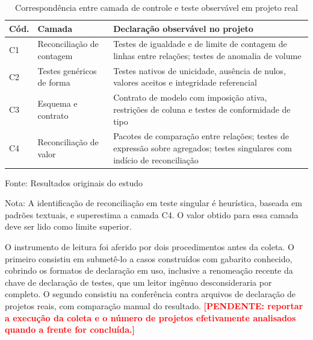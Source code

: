 \documentclass[11pt,a4paper]{article}
\newcommand{\fonteprop}[1]{%
  \par\vspace{2pt}%
  {\singlespacing\fontsize{11}{13}\selectfont\RaggedRight Fonte: #1\par}}
\newcommand{\fonteoriginal}{\fonteprop{Resultados originais do estudo}}
\newcommand{\notatab}[1]{%
  \par{\singlespacing\fontsize{11}{13}\selectfont\RaggedRight Nota: #1\par}}
\newcommand{\pend}[1]{\textcolor{red}{\textbf{[PENDENTE: #1]}}}
\begin{document}
\begin{table}[htbp]
\centering
\caption{Correspondência entre camada de controle e teste observável em projeto real}
\label{tab:mapeamento}
\begin{singlespace}
\fontsize{10}{12}\selectfont
\begin{tabular}{@{}p{0.8cm}p{4.4cm}p{9.4cm}@{}}
\toprule
\textbf{Cód.} & \textbf{Camada} & \textbf{Declaração observável no projeto} \\
\midrule
C1 & Reconciliação de contagem & Testes de igualdade e de limite de contagem de linhas entre relações; testes de anomalia de volume \\
C2 & Testes genéricos de forma & Testes nativos de unicidade, ausência de nulos, valores aceitos e integridade referencial \\
C3 & Esquema e contrato & Contrato de modelo com imposição ativa, restrições de coluna e testes de conformidade de tipo \\
C4 & Reconciliação de valor & Pacotes de comparação entre relações; testes de expressão sobre agregados; testes singulares com indício de reconciliação \\
\bottomrule
\end{tabular}
\end{singlespace}
\fonteoriginal
\notatab{A identificação de reconciliação em teste singular é heurística,
baseada em padrões textuais, e superestima a camada C4. O valor obtido
para essa camada deve ser lido como limite superior.}
\end{table}

O instrumento de leitura foi aferido por dois procedimentos antes da
coleta. O primeiro consistiu em submetê-lo a casos construídos com gabarito
conhecido, cobrindo os formatos de declaração em uso, inclusive a
renomeação recente da chave de declaração de testes, que um leitor ingênuo
desconsideraria por completo. O segundo consistiu na conferência contra
arquivos de declaração de projetos reais, com comparação manual do
resultado. \pend{reportar a execução da coleta e o número de projetos
efetivamente analisados quando a frente for concluída.}

\end{document}

